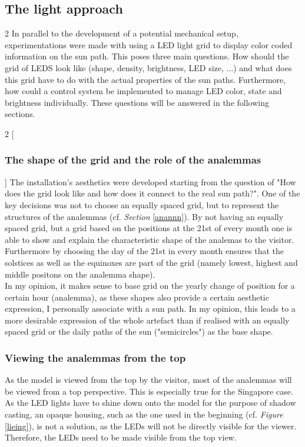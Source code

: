 \documentclass[a4paper,9pt]{article}
\begin{document}
\subsection{The light approach}\label{light}
\begin{multicols}{2}
In parallel to the development of a potential mechanical setup, experimentations were made with using a LED light grid to display color coded information on the sun path. This poses three main questions. How should the grid of LEDS look like (shape, density, brightness, LED size, ...) and what does this grid have to do with the actual properties of the sun paths. Furthermore, how could a control system be implemented to manage LED color, state and brightness individually. These questions will be answered in the following sections.
\end{multicols}
\begin{multicols}{2}
[
\subsubsection{The shape of the grid and the role of the analemmas}
\label{ana}
]
    The installation's aesthetics were developed starting from the question of "How does the grid look like and how does it connect to the real sun path?". One of the key decisions was not to choose an equally spaced grid, but to represent the structures of the analemmas (cf. \textit{Section} \ref{anannn}). By not having an equally spaced grid, but a grid based on the positions at the 21st of every month one is able to show and explain the characteristic shape of the analemas to the visitor. Furthermore by choosing the day of the 21st in every month ensures that the solstices as well as the equinoxes are part of the grid (namely lowest, highest and middle positons on the analemma shape).\\
    In my opinion, it makes sense to base grid on the yearly change of position for a certain hour (analemma), as these shapes also provide a certain aesthetic expression, I personally associate with a sun path. In my opinion, this leads to a more desirable expression of the whole artefact than if realised with an equally spaced grid or the daily paths of the sun ("semicircles") as the base shape. 
    
    \subsubsection{Viewing the analemmas from the top}
    As the model is viewed from the top by the visitor, most of the analemmas will be viewed from a top perspective. This is especially true for the Singapore case. As the LED lights have to shine down onto the model for the purpose of shadow casting, an opaque housing, such as the one used in the beginning (cf. \textit{Figure} \ref{lieing}), is not a solution, as the LEDs will not be directly visible for the viewer. Therefore, the LEDs need to be made visible from the top view.
    \end{multicols}
\end{document}
